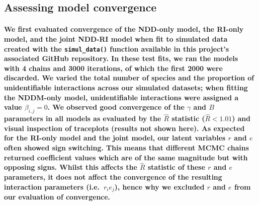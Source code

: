 \documentclass[a4,12pt]{article}
\begin{document}
\begin{refsection}

    \subsection{Assessing model convergence}
        \paragraph{}
        \textbf{We first evaluated convergence of the NDD-only model, the RI-only model, and the joint NDD-RI model when fit to simulated data created with the \texttt{simul\_data()} function available in this project's associated GitHub repository. In these test fits, we ran the models with 4 chains and 3000 iterations, of which the first 2000 were discarded. We varied the total number of species and the proportion of unidentifiable interactions across our simulated datasets; when fitting the NDDM-only model, unidentifiable interactions were assigned a value $\beta_{i,j} = 0$. We observed good convergence of the $\gamma$ and $B$ parameters in all models as evaluated by the $\hat{R}$ statistic ($\hat{R} < 1.01$) and visual inspection of traceplots (results not shown here).
        As expected for the RI-only model and the joint model, our latent variables $r$ and $e$ often showed sign switching. This means that different MCMC chains returned coefficient values which are of the same magnitude but with opposing signs. Whilst this affects the $\hat{R}$ statistic of these $r$ and $e$ parameters, it does not affect the convergence of the resulting interaction parameters (i.e.\ $r_i e_j$), hence why we excluded $r$ and $e$ from our evaluation of convergence.}


\end{refsection}
\end{document}
